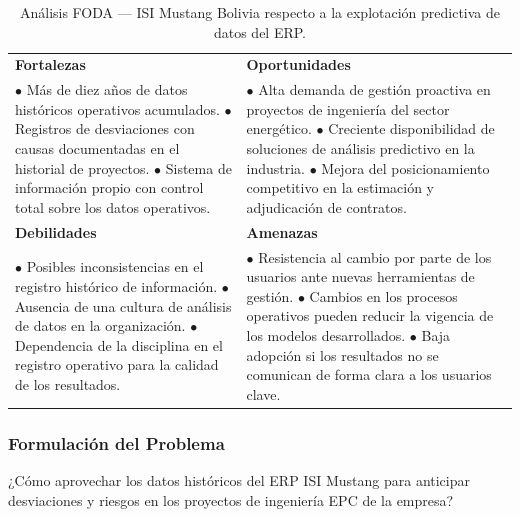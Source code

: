 \documentclass{univalle-perfil}
\begin{document}
\begin{table}[htbp]
\centering
\small
\caption{Análisis FODA — ISI Mustang Bolivia respecto a la explotación predictiva de datos del ERP.}
\label{tab:foda}
\renewcommand{\arraystretch}{1.4}
\begin{tabular}{|>{\raggedright\arraybackslash}p{}|>{\raggedright\arraybackslash}p{}|}
\hline
\textbf{Fortalezas} & \textbf{Oportunidades} \\[2pt]
$\bullet$ Más de diez años de datos históricos operativos acumulados. \newline
$\bullet$ Registros de desviaciones con causas documentadas en el historial de proyectos. \newline
$\bullet$ Sistema de información propio con control total sobre los datos operativos.
&
$\bullet$ Alta demanda de gestión proactiva en proyectos de ingeniería del sector energético. \newline
$\bullet$ Creciente disponibilidad de soluciones de análisis predictivo en la industria. \newline
$\bullet$ Mejora del posicionamiento competitivo en la estimación y adjudicación de contratos. \\
\hline
\textbf{Debilidades} & \textbf{Amenazas} \\[2pt]
$\bullet$ Posibles inconsistencias en el registro histórico de información. \newline
$\bullet$ Ausencia de una cultura de análisis de datos en la organización. \newline
$\bullet$ Dependencia de la disciplina en el registro operativo para la calidad de los resultados.
&
$\bullet$ Resistencia al cambio por parte de los usuarios ante nuevas herramientas de gestión. \newline
$\bullet$ Cambios en los procesos operativos pueden reducir la vigencia de los modelos desarrollados. \newline
$\bullet$ Baja adopción si los resultados no se comunican de forma clara a los usuarios clave. \\
\hline
\end{tabular}
\end{table}

\subsubsection{Formulación del Problema}

¿Cómo aprovechar los datos históricos del ERP ISI Mustang para anticipar desviaciones y riesgos en los proyectos de ingeniería EPC de la empresa?
\end{document}
